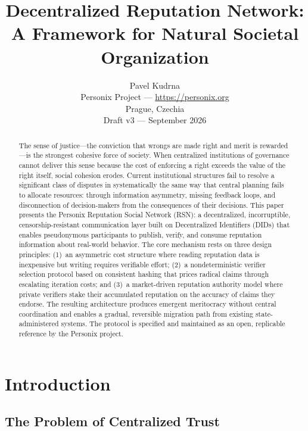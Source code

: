 \documentclass[11pt,a4paper,twocolumn]{article}
\title{\textbf{Decentralized Reputation Network:\\A Framework for Natural Societal Organization}}
\author{Pavel Kudrna\\Personix Project --- \url{https://personix.org}\\Prague, Czechia\\Draft v3 --- September 2026}
\date{}
\begin{document}
\maketitle

\begin{abstract}
The sense of justice---the conviction that wrongs are made right and merit is rewarded---is the strongest cohesive force of society. When centralized institutions of governance cannot deliver this sense because the cost of enforcing a right exceeds the value of the right itself, social cohesion erodes. Current institutional structures fail to resolve a significant class of disputes in systematically the same way that central planning fails to allocate resources: through information asymmetry, missing feedback loops, and disconnection of decision-makers from the consequences of their decisions. This paper presents the Personix Reputation Social Network (RSN): a decentralized, incorruptible, censorship-resistant communication layer built on Decentralized Identifiers (DIDs) that enables pseudonymous participants to publish, verify, and consume reputation information about real-world behavior. The core mechanism rests on three design principles: (1)~an asymmetric cost structure where reading reputation data is inexpensive but writing requires verifiable effort; (2)~a nondeterministic verifier selection protocol based on consistent hashing that prices radical claims through escalating iteration costs; and (3)~a market-driven reputation authority model where private verifiers stake their accumulated reputation on the accuracy of claims they endorse. The resulting architecture produces emergent meritocracy without central coordination and enables a gradual, reversible migration path from existing state-administered systems. The protocol is specified and maintained as an open, replicable reference by the Personix project.
\end{abstract}

\section{Introduction}

\subsection{The Problem of Centralized Trust}
\end{document}
